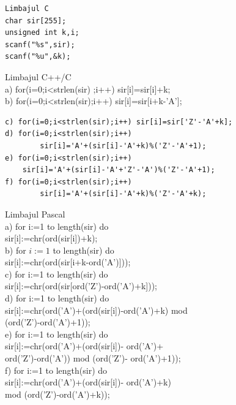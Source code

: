 \documentclass[10pt]{article}
\begin{document}
\begin{verbatim}
Limbajul C
char sir[255];
unsigned int k,i;
scanf("%s",sir);
scanf("%u",&k);
\end{verbatim}

Limbajul C++/C\\[0pt]
a) for(i=0;i<strlen(sir) ;i++) sir[i]=sir[i]+k;\\[0pt]
b) for(i=0;i<strlen(sir);i++) sir[i]=sir[i+k-'A'];

\begin{verbatim}
c) for(i=0;i<strlen(sir);i++) sir[i]=sir['Z'-'A'+k];
d) for(i=0;i<strlen(sir);i++)
        sir[i]='A'+(sir[i]-'A'+k)%('Z'-'A'+1);
e) for(i=0;i<strlen(sir);i++)
    sir[i]='A'+(sir[i]-'A'+'Z'-'A')%('Z'-'A'+1);
f) for(i=0;i<strlen(sir);i++)
        sir[i]='A'+(sir[i]-'A'+k)%('Z'-'A'+k);
\end{verbatim}

Limbajul Pascal\\
a) for i:=1 to length(sir) do\\[0pt]
sir[i]:=chr(ord(sir[i])+k);\\
b) for $i:=1$ to length(sir) do\\[0pt]
sir[i]:=chr(ord(sir[i+k-ord('A')]));\\
c) for i:=1 to length(sir) do\\[0pt]
sir[i]:=chr(ord(sir[ord('Z')-ord('A')+k]));\\
d) for i:=1 to length(sir) do\\[0pt]
sir[i]:=chr(ord('A')+(ord(sir[i])-ord('A')+k) mod\\
(ord('Z')-ord('A')+1));\\
e) for i:=1 to length(sir) do\\[0pt]
sir[i]:=chr(ord('A')+(ord(sir[i])- ord('A')+\\
ord('Z')-ord('A')) mod (ord('Z')- ord('A')+1));\\
f) for i:=1 to length(sir) do\\[0pt]
sir[i]:=chr(ord('A')+(ord(sir[i])- ord('A')+k)\\
mod (ord('Z')-ord('A')+k));
\end{document}
